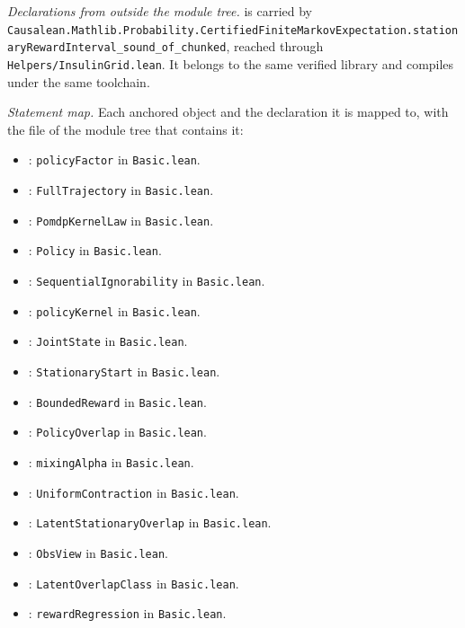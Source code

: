 \emph{Declarations from outside the module tree.}  is carried by \texttt{Causalean.\allowbreak Mathlib.\allowbreak Probability.\allowbreak CertifiedFiniteMarkovExpectation.\allowbreak stationaryRewardInterval\_sound\_of\_chunked}, reached through \texttt{Helpers/InsulinGrid.lean}. It belongs to the same verified library and compiles under the same toolchain.

\emph{Statement map.} Each anchored object and the declaration it is mapped to, with the file of the module tree that contains it:
\begin{itemize}
\setlength{\itemsep}{0pt}
\item {}: \texttt{policyFactor} in \texttt{Basic.lean}.
\item {}: \texttt{FullTrajectory} in \texttt{Basic.lean}.
\item {}: \texttt{PomdpKernelLaw} in \texttt{Basic.lean}.
\item {}: \texttt{Policy} in \texttt{Basic.lean}.
\item {}: \texttt{SequentialIgnorability} in \texttt{Basic.lean}.
\item {}: \texttt{policyKernel} in \texttt{Basic.lean}.
\item {}: \texttt{JointState} in \texttt{Basic.lean}.
\item {}: \texttt{StationaryStart} in \texttt{Basic.lean}.
\item {}: \texttt{BoundedReward} in \texttt{Basic.lean}.
\item {}: \texttt{PolicyOverlap} in \texttt{Basic.lean}.
\item {}: \texttt{mixingAlpha} in \texttt{Basic.lean}.
\item {}: \texttt{UniformContraction} in \texttt{Basic.lean}.
\item {}: \texttt{LatentStationaryOverlap} in \texttt{Basic.lean}.
\item {}: \texttt{ObsView} in \texttt{Basic.lean}.
\item {}: \texttt{LatentOverlapClass} in \texttt{Basic.lean}.
\item {}: \texttt{rewardRegression} in \texttt{Basic.lean}.

\end{itemize}
